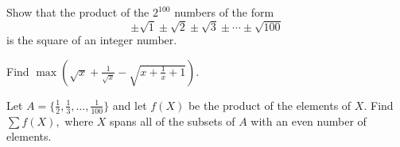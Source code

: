 \documentclass{article}
\begin{document}
\begin{req}[]{4}
Show that the product of the $2^{100}$ numbers of the form
\[\pm\sqrt{1}\pm\sqrt{2}\pm\sqrt{3}\pm\cdots\pm\sqrt{100}\]
is the square of an integer number.
\end{req}

\begin{prob}[]{6}
Find $\max\left(\sqrt{x}+\frac{1}{\sqrt{x}}-\sqrt{x+\frac{1}{x}+1}\right).$
\end{prob}

\begin{prob}[]{6}
Let $A=\{\frac{1}{2},\frac{1}{3},\ldots,\frac{1}{100}\}$ and let $f(X)$ be the product of the elements of $X.$ Find $\sum f(X),$ where $X$ spans all of the subsets of $A$ with an even number of elements.
\end{prob}
\end{document}
